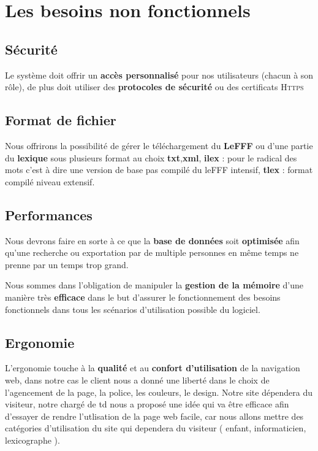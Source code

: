 \section{Les besoins non fonctionnels}

\subsection{Sécurité}
{Le système doit offrir un \textbf{accès personnalisé} pour nos utilisateurs (chacun à son rôle), de plus doit utiliser des \textbf{protocoles de sécurité} ou des certificats \textsc{Https} }

\subsection{Format de fichier}
Nous offrirons la possibilité de gérer le téléchargement du \textbf{LeFFF} ou d'une partie du \textbf{lexique} sous plusieurs format au choix  \textbf{txt},\textbf{xml}, \textbf{ilex} : pour le radical des mots c'est à dire une version de base pas compilé du leFFF intensif, \textbf{tlex} : format compilé niveau extensif.

\subsection{Performances}

{Nous devrons faire en sorte à ce que la \textbf{base de données} soit \textbf{optimisée} afin qu'une recherche ou exportation par de multiple personnes en même temps ne prenne par un temps trop grand.\par}
Nous sommes dans l'obligation de manipuler la \textbf{gestion de la mémoire} d'une manière très \textbf{efficace} dans le but d'assurer le fonctionnement des besoins fonctionnels dans tous les scénarios d'utilisation possible du logiciel. 

\subsection{Ergonomie}
L’ergonomie touche à la \textbf{qualité} et au \textbf{confort d’utilisation} de la navigation web, dans notre cas le client nous a donné une liberté dans le choix de l'agencement de la page, la police, les couleurs, le design. Notre site dépendera du visiteur, notre chargé de td nous a proposé une idée qui va être efficace afin d'essayer de rendre l'utlisation de la page web facile, car nous allons mettre des catégories d'utilisation du site qui dependera du visiteur ( enfant, informaticien, lexicographe ).

